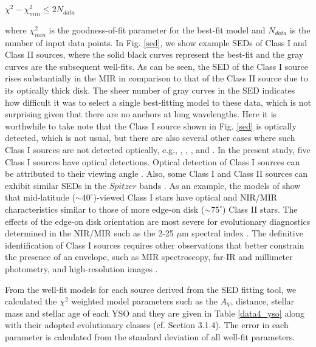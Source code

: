 \documentclass[a4paper,fleqn,usenatbib,useAMS]{mnras}
\begin{document}
$\chi^2 - \chi^2_{min} \leq 2 N_{data}$

where $\chi^2_{min}$ is the goodness-of-fit parameter for the
best-fit model and $N_{data}$ is the number of input data points.
In Fig. \ref{sed}, we show example SEDs of Class I and Class II
sources, where the solid black curves represent 
the best-fit and the gray curves are the subsequent well-fits. 
As can be seen, the SED of the Class I source rises substantially in the MIR in comparison to that of the Class II source
due to its optically thick disk.
The sheer number of gray curves in the SED indicates how difficult it was to select a single best-fitting model to
these data, which is not surprising given that there are no anchors at long wavelengths. 
Here it is worthwhile to take note that the Class I source
shown in Fig. \ref {sed} is optically detected, which is not usual,
but there are also several other cases where such Class I sources are not detected optically,
e.g., \citet[][NGC 1931]{2013ApJ...764..172P}, \citet[][Sh 2-252]{2013MNRAS.432.3445J}, 
 \citet[][W5-East]{2011MNRAS.415.1202C}, \citet[][Sh 2-255-257]{2011ApJ...738..156O}
and \citet[][Sh-2 311]{2016MNRAS.461.2502Y}. 
In the present study, five Class I sources have optical detections.
Optical detection of Class I sources can be attributed to their viewing angle 
\citep{2005A&A...429..543N,2007prpl.conf..117W,2011ARA&A..49...67W}.
Also, some Class I and Class II sources can exhibit similar SEDs in the $Spitzer$ bands 
\citep{2005ApJ...629..881H,2011ARA&A..49...67W,2006ApJS..167..256R}. As an example, the models of 
\citet{2003ApJ...591.1049W} show that mid-latitude ($\sim40^\circ$)-viewed Class I stars have optical
and NIR/MIR characteristics similar to those of more edge-on disk ($\sim75^\circ$) Class II stars. 
The effects of the edge-on disk orientation are most severe for evolutionary diagnostics 
determined in the NIR/MIR such as the 2-25 $\mu$m spectral 
index \citep{2007prpl.conf..117W}. The definitive identification of Class I 
sources requires other observations that better constrain the presence of an envelope, 
such as MIR spectroscopy, far-IR and millimeter photometry, 
and high-resolution images \citep{2010ApJS..186..111L}.

From the well-fit models for each source derived
from the SED fitting tool, we calculated the $\chi^2$ weighted
model parameters such as the $A_V$, distance, stellar mass and stellar age of each  YSO
and they are given in Table \ref {data4_yso} along with their
adopted evolutionary classes (cf. Section 3.1.4). 
The error in each parameter is calculated from the standard deviation of all well-fit parameters. 
\end{document}
